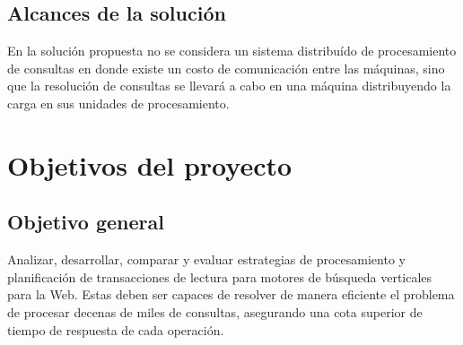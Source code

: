 \subsection{Alcances de la solución}
\label{intro:alcancesdelasolucion}
En la solución propuesta no se considera un sistema distribuído de procesamiento de consultas en donde existe un costo de comunicación entre las máquinas, sino que la resolución de consultas se llevará a cabo en una máquina distribuyendo la carga en sus unidades de procesamiento.

% 


\section{Objetivos del proyecto}
\label{intro:objetivosysolucion}



\subsection{Objetivo general}
\label{intro:objetivogeneral}
Analizar, desarrollar, comparar y evaluar estrategias de procesamiento y planificación de transacciones de lectura para motores de búsqueda verticales para la Web. Estas deben ser capaces de resolver de manera eficiente el problema de procesar decenas de miles de consultas, asegurando una cota superior de tiempo de respuesta de cada operación.


